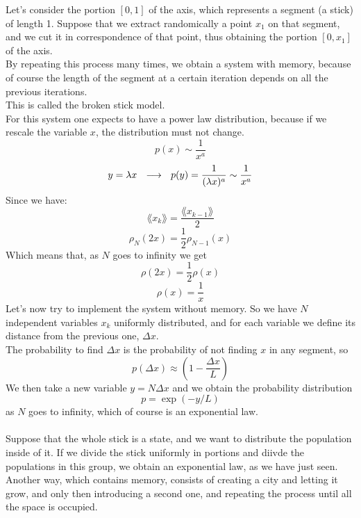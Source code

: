 Let's consider the portion $[0,1]$ of the axis, which represents a segment (a stick) of length 1. Suppose that we extract randomically a point $x_1$ on that segment, and we cut it in correspondence of that point, thus obtaining the portion $[0,x_1]$ of the axis. \\
By repeating this process many times, we obtain a system with memory, because of course the length of the segment at a certain iteration depends on all the previous iterations. \\
This is called the broken stick model. \\
For this system one expects to have a power law distribution, because if we rescale the variable $x$, the distribution must not change.
$$
	p(x) \sim \frac{1}{x^a}
$$
$$
	y = \lambda x \ \ \longrightarrow \ \ p(y) = \frac{1}{(\lambda x)^a} \sim \frac{1}{x^a}
$$
Since we have:
$$
	\lang x_k \rang = \frac{\lang x_{k-1} \rang}{2}
$$
$$
	\rho_N(2x) = \frac{1}{2}\rho_{N-1}(x)
$$
Which means that, as $N$ goes to infinity we get
$$
	\rho(2x) = \frac{1}{2}\rho(x)
$$
$$
	\rho(x) = \frac{1}{x}
$$
Let's now try to implement the system without memory. So we have $N$ independent variables $x_k$ uniformly distributed, and for each variable we define its distance from the previous one, $\Delta x$. \\
The probability to find $\Delta x$ is the probability of not finding $x$ in any segment, so
$$
	p(\Delta x) \approx \left( 1 - \frac{\Delta x}{L} \right)
$$
We then take a new variable $y = N\Delta x$ and we obtain the probability distribution
$$
	p = \exp(-y/L)
$$
as $N$ goes to infinity, which of course is an exponential law. \\ \\
Suppose that the whole stick is a state, and we want to distribute the population inside of it. If we divide the stick uniformly in portions and diivde the populations in this group, we obtain an exponential law, as we have just seen. \\
Another way, which contains memory, consists of creating a city and letting it grow, and only then introducing a second one, and repeating the process until all the space is occupied. 
